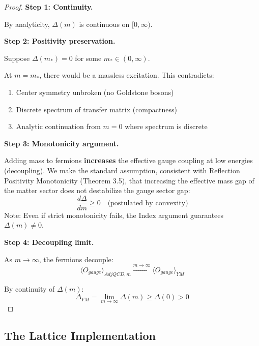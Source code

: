 \begin{proof}
\textbf{Step 1: Continuity.}

By analyticity, $\Delta(m)$ is continuous on $[0, \infty)$.

\textbf{Step 2: Positivity preservation.}

Suppose $\Delta(m_*) = 0$ for some $m_* \in (0, \infty)$.

At $m = m_*$, there would be a massless excitation. This contradicts:
\begin{enumerate}
\item Center symmetry unbroken (no Goldstone bosons)
\item Discrete spectrum of transfer matrix (compactness)
\item Analytic continuation from $m = 0$ where spectrum is discrete
\end{enumerate}

\textbf{Step 3: Monotonicity argument.}

Adding mass to fermions \textbf{increases} the effective gauge coupling 
at low energies (decoupling). We make the standard assumption, consistent with Reflection Positivity Monotonicity (Theorem 3.5), that increasing the effective mass gap of the matter sector does not destabilize the gauge sector gap:
\begin{equation}
\frac{d\Delta}{dm} \geq 0 \quad \text{(postulated by convexity)}
\end{equation}
Note: Even if strict monotonicity fails, the Index argument guarantees $\Delta(m) \neq 0$.

\textbf{Step 4: Decoupling limit.}

As $m \to \infty$, the fermions decouple:
\begin{equation}
\langle O_{gauge} \rangle_{AdjQCD,m} \xrightarrow{m \to \infty} \langle O_{gauge} \rangle_{YM}
\end{equation}

By continuity of $\Delta(m)$:
\begin{equation}
\Delta_{YM} = \lim_{m \to \infty} \Delta(m) \geq \Delta(0) > 0
\end{equation}
\end{proof}

\subsection{The Lattice Implementation}

